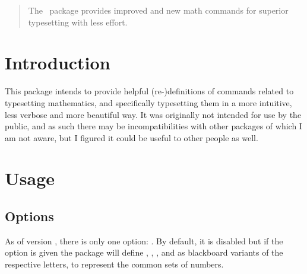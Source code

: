 \documentclass[commonsets,load]{skdoc}
\begin{document}

  \author{Simon Sigurdhsson}

  \maketitle
  \begin{abstract}
    The \thepackage\ package provides improved and new math commands
    for superior typesetting with less effort.
  \end{abstract}

  \section{Introduction}
  This package intends to provide helpful (re-)definitions of commands
  related to typesetting mathematics, and specifically typesetting
  them in a more intuitive, less verbose and more beautiful way.
  It was originally not intended for use by the public, and as such
  there may be incompatibilities with other packages of which I am
  not aware, but I figured it could be useful to other people as well.

  \section{Usage}
  \subsection{Options}
  As of version \theversion, there is only one option: .
  By default, it is disabled but if the option is given the package will
  define , , ,  and  as blackboard 
  variants of the respective letters, to represent the common sets
  of numbers.
\end{document}
